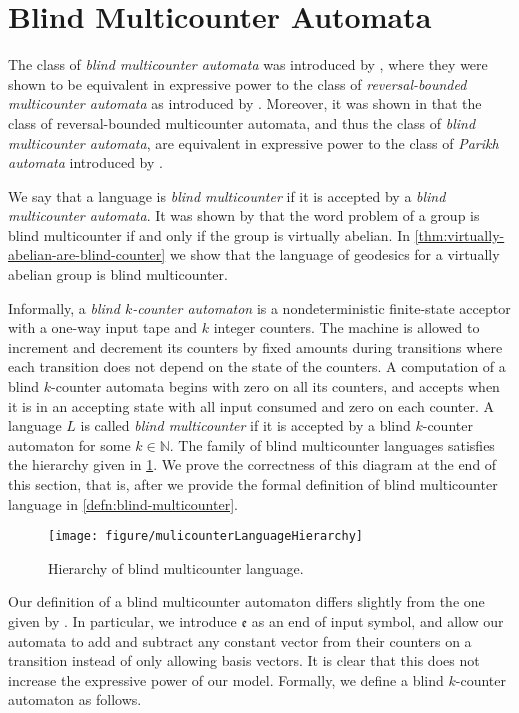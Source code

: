 \section{Blind Multicounter Automata}\label{sec:blind-multicounter-automata}

The class of \emph{blind multicounter automata} was introduced by \textcite{greibach1978}, where they were shown \cite[Theorem~2]{greibach1978} to be equivalent in expressive power to the class of \emph{reversal-bounded multicounter automata} as introduced by \textcite{baker1974}.
Moreover, it was shown in \cite[\S~2.2]{klaedtke2002} that the class of reversal-bounded multicounter automata, and thus the class of \emph{blind multicounter automata}, are equivalent in expressive power to the class of \emph{Parikh automata} introduced by \textcite{klaedtke2003}.

We say that a language is \emph{blind multicounter} if it is accepted by a \emph{blind multicounter automata}.
It was shown by \textcite{elder2008} that the word problem of a group is blind multicounter if and only if the group is virtually abelian.
In \cref{thm:virtually-abelian-are-blind-counter} we show that the language of geodesics for a virtually abelian group is blind multicounter.

Informally, a \emph{blind $k$-counter automaton} is a nondeterministic finite-state acceptor with a one-way input tape and $k$ integer counters.
The machine is allowed to increment and decrement its counters by fixed amounts during transitions where each transition does not depend on the state of the counters.
A computation of a blind $k$-counter automata begins with zero on all its counters, and accepts when it is in an accepting state with all input consumed and zero on each counter.
A language $L$ is called \emph{blind multicounter} if it is accepted by a blind $k$-counter automaton for some $k \in \mathbb{N}$.
The family of blind multicounter languages satisfies the hierarchy given in \cref{fig:language-hierarchy}.
We prove the correctness of this diagram at the end of this section, that is, after we provide the formal definition of blind multicounter language in \cref{defn:blind-multicounter}.

\begin{figure}[h!t]
	\centering
	\texttt{[image: figure/mulicounterLanguageHierarchy]}
	\caption{Hierarchy of blind multicounter language.}\label{fig:language-hierarchy}
\end{figure}

Our definition of a blind multicounter automaton differs slightly from the one given by \textcite{greibach1978}.
In particular, we introduce $\mathfrak{e}$ as an end of input symbol, and allow our automata to add and subtract any constant vector from their counters on a transition instead of only allowing basis vectors.
It is clear that this does not increase the expressive power of our model.
Formally, we define a blind $k$-counter automaton as follows.

